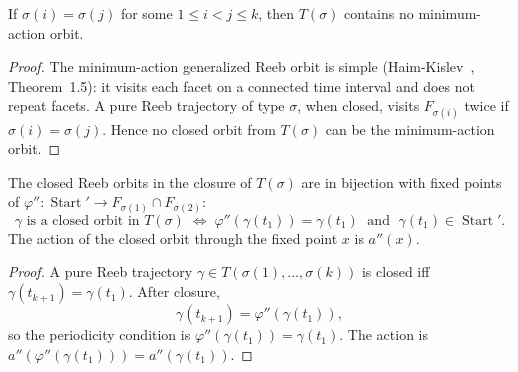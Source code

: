 \begin{unverified}
\begin{lemma}\label{lem:prune-simple}
If $\sigma(i) = \sigma(j)$ for some $1 \leq i < j \leq k$,
then $T(\sigma)$ contains no minimum-action orbit.
\end{lemma}

\begin{proof}
The minimum-action generalized Reeb orbit is simple
(Haim-Kislev~\cite{HK2017}, Theorem~1.5):
it visits each facet on a connected time interval and does not repeat facets.
A pure Reeb trajectory of type $\sigma$, when closed,
visits $F_{\sigma(i)}$ twice if $\sigma(i) = \sigma(j)$.
Hence no closed orbit from $T(\sigma)$ can be the minimum-action orbit.
\end{proof}
\end{unverified}

\begin{unverified}
\begin{lemma}\label{lem:fixed-point}
The closed Reeb orbits in the closure of $T(\sigma)$ are in bijection with
fixed points of $\varphi'' \colon \operatorname{Start}' \to F_{\sigma(1)} \cap F_{\sigma(2)}$:
\[
  \gamma \text{ is a closed orbit in } T(\sigma)
  \;\Longleftrightarrow\;
  \varphi''(\gamma(t_1)) = \gamma(t_1)
  \;\text{ and }\;
  \gamma(t_1) \in \operatorname{Start}'.
\]
The action of the closed orbit through the fixed point $x$ is $a''(x)$.
\end{lemma}

\begin{proof}
A pure Reeb trajectory $\gamma \in T(\sigma(1), \ldots, \sigma(k))$
is closed iff $\gamma(t_{k+1}) = \gamma(t_1)$.
After closure,
\[
  \gamma(t_{k+1}) = \varphi''(\gamma(t_1)),
\]
so the periodicity condition is $\varphi''(\gamma(t_1)) = \gamma(t_1)$.
The action is $a''(\varphi''(\gamma(t_1))) = a''(\gamma(t_1))$.
\end{proof}
\end{unverified}


